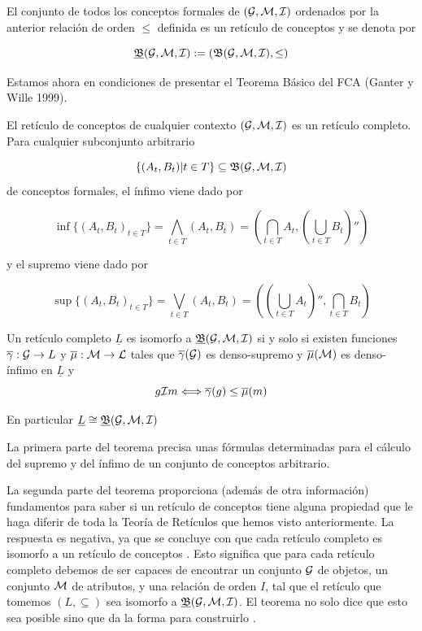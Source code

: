 \documentclass[oneside,openright,titlepage,numbers=noenddot,openany,headinclude,footinclude=true,
cleardoublepage=empty,abstractoff,BCOR=5mm,paper=a4,fontsize=12pt,main=spanish]{scrreprt}
\begin{document}
\begin{definition} El conjunto de todos los conceptos formales de $(\mathcal{G},\mathcal{M},\mathcal{I})$ ordenados por la anterior relación de orden $\leq$ definida es un retículo de conceptos y se denota por 

$$\underline{\mathfrak{B}}(\mathcal{G},\mathcal{M},\mathcal{I}):= (\mathfrak{B}(\mathcal{G},\mathcal{M},\mathcal{I}),\leq)$$

\end{definition}

Estamos ahora en condiciones de presentar el Teorema Básico del FCA (Ganter y Wille 1999).

\begin{theorem}
El retículo de conceptos de cualquier contexto $(\mathcal{G},\mathcal{M},\mathcal{I})$ es un retículo completo. Para cualquier subconjunto arbitrario

$$\{(A_t,B_t) | t\in T \} \subseteq\mathfrak{B}(\mathcal{G},\mathcal{M},\mathcal{I})$$  
de conceptos formales, el ínfimo viene dado por


\begin{equation}\label{infimo reticulo}
    \inf\{(A_{t}, B_{t})_{t \in T}\} = \bigwedge_{t\in T}(A_{t},B_{t})= (\bigcap_{t \in T}A_{t}, (\bigcup_{t \in T}B_{t})'') 
\end{equation}


y el supremo viene dado por

\begin{equation}\label{supremo reticulo}
    \sup\{(A_{t}, B_{t})_{t \in T}\} = \bigvee_{t\in T}(A_{t},B_{t})= ((\bigcup_{t \in T}A_{t})'', \bigcap_{t \in T}B_{t})
\end{equation}


Un retículo completo $\underline{L}$ es isomorfo a $\underline{\mathfrak{B}}(\mathcal{G},\mathcal{M},\mathcal{I})$ si y solo si existen funciones $\overline{\gamma}:\mathcal{G} \to L$ y $\overline{\mu}:\mathcal{M} \to \mathcal{L}$ tales que $\overline{\gamma}(\mathcal{G})$ es denso-supremo y $\overline{\mu}(\mathcal{M})$ es denso-ínfimo en $\underline{L}$ y $$g \mathcal{I} m \Longleftrightarrow \overline{\gamma}(g) \leq \overline{\mu}(m) $$

En particular $\underline{L} \cong \underline{\mathfrak{B}}(\mathcal{G},\mathcal{M},\mathcal{I})$
 
\end{theorem}

La primera parte del teorema precisa unas fórmulas determinadas para el cálculo del supremo y del ínfimo de un conjunto de conceptos arbitrario. 

La segunda parte del teorema proporciona (además de otra información) fundamentos para saber si un retículo de conceptos tiene alguna propiedad que le haga diferir de toda la Teoría de Retículos que hemos visto anteriormente. La respuesta es negativa, ya que se concluye con que cada retículo completo es isomorfo a un retículo de conceptos \cite{conceptualexploration}. Esto significa que para cada retículo completo debemos de ser capaces de encontrar un conjunto $\mathcal{G}$ de objetos, un conjunto $\mathcal{M}$ de atributos, y una relación de orden $I$, tal que el retículo que tomemos $(L,\subseteq)$ sea isomorfo a $\underline{\mathfrak{B}}(\mathcal{G},\mathcal{M},\mathcal{I})$. El teorema no solo dice que esto sea posible sino que da la forma para construirlo . 
\end{document}
